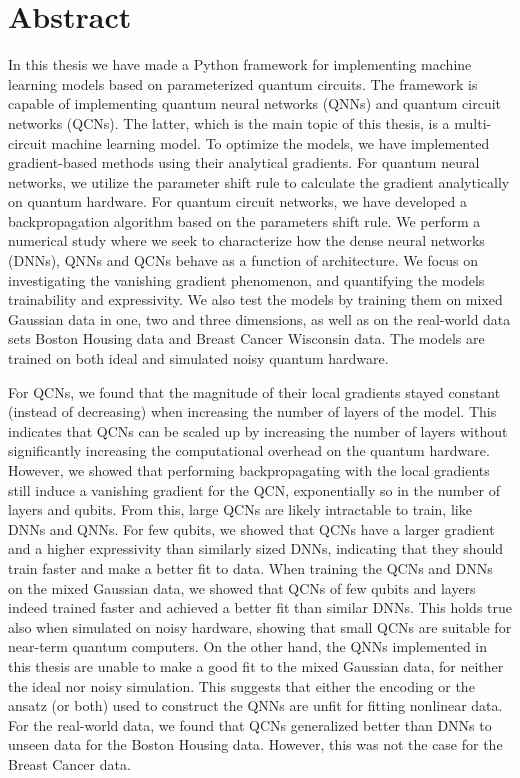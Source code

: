\chapter*{Abstract}
\thispagestyle{plain}

In this thesis we have made a Python framework for implementing machine learning models based on parameterized quantum circuits. The framework is capable of implementing quantum neural networks (QNNs) and quantum circuit networks (QCNs). The latter, which is the main topic of this thesis, is a multi-circuit machine learning model. To optimize the models, we have implemented gradient-based methods using their analytical gradients. For quantum neural networks, we utilize the parameter shift rule to calculate the gradient analytically on quantum hardware. For quantum circuit networks, we have developed a backpropagation algorithm based on the parameters shift rule. We perform a numerical study where we seek to characterize how the dense neural networks (DNNs), QNNs and QCNs behave as a function of architecture. We focus on investigating the vanishing gradient phenomenon, and quantifying the models trainability and expressivity. We also test the models by training them on mixed Gaussian data in one, two and three dimensions, as well as on the real-world data sets Boston Housing data and Breast Cancer Wisconsin data. The models are trained on both ideal and simulated noisy quantum hardware.

For QCNs, we found that the magnitude of their local gradients stayed constant (instead of decreasing) when increasing the number of layers of the model. This indicates that QCNs can be scaled up by increasing the number of layers without significantly increasing the computational overhead on the quantum hardware. However, we showed that performing backpropagating with the local gradients still induce a vanishing gradient for the QCN, exponentially so in the number of layers and qubits. From this, large QCNs are likely intractable to train, like DNNs and QNNs. For few qubits, we showed that QCNs have a larger gradient and a higher expressivity than similarly sized DNNs, indicating that they should train faster and make a better fit to data. When training the QCNs and DNNs on the mixed Gaussian data, we showed that QCNs of few qubits and layers indeed trained faster and achieved a better fit than similar DNNs. This holds true also when simulated on noisy hardware, showing that small QCNs are suitable for near-term quantum computers. On the other hand, the QNNs implemented in this thesis are unable to make a good fit to the mixed Gaussian data, for neither the ideal nor noisy simulation. This suggests that either the encoding or the ansatz (or both) used to construct the QNNs are unfit for fitting nonlinear data. For the real-world data, we found that QCNs generalized better than DNNs to unseen data for the Boston Housing data. However, this was not the case for the Breast Cancer data.